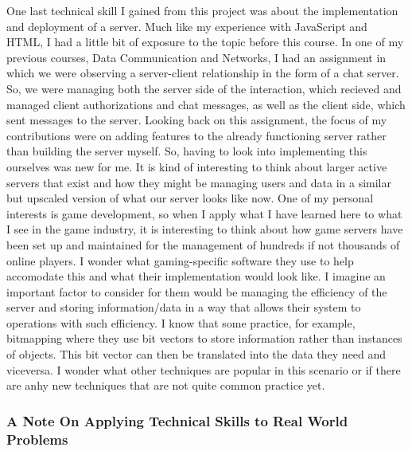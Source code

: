 \documentclass{article}
\theoremstyle{theorem}
\theoremstyle{definition}
\theoremstyle{remark}
\begin{document}
One last technical skill I gained from this project was about the implementation and deployment of a server. Much like my experience with JavaScript and HTML, I had a little bit of exposure to the topic before this course. In one of my previous courses, Data Communication and Networks, I had an assignment in which we were observing a server-client 
relationship in the form of a chat server. So, we were managing both the server side of the interaction, which recieved and managed client authorizations and chat messages, as well as the client side, which sent messages to the server. Looking back on this assignment, the focus of my contributions were on 
adding features to the already functioning server rather than building the server myself. So, having to look into implementing this ourselves was new for me. It is kind of interesting to think about larger active servers that exist and how they might be managing users and data in a similar but upscaled version of what 
our server looks like now. One of my personal interests is game development, so when I apply what I have learned here to what I see in the game industry, it is interesting to think about how game servers have been set up and maintained for the management of hundreds if not thousands of online players. I wonder what gaming-specific 
software they use to help accomodate this and what their implementation would look like. I imagine an important factor to consider for them would be managing the efficiency of the server and storing information/data in a way that allows their system to operations with such efficiency. I know that some practice, for example, bitmapping where 
they use bit vectors to store information rather than instances of objects. This bit vector can then be translated into the data they need and viceversa. I wonder what other techniques are popular in this scenario or if there are anhy new techniques that are not quite common practice yet.  \\

\subsubsection{A Note On Applying Technical Skills to Real World Problems}
\end{document}
